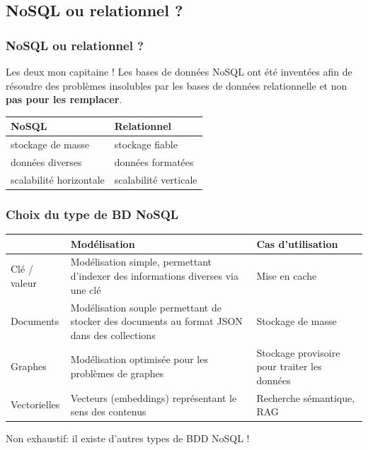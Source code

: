     \subsection{NoSQL ou relationnel ?}
        \begin{frame}
            \frametitle{NoSQL ou relationnel ?}

            \begin{alertblock}{Les deux mon capitaine !}
                Les bases de données NoSQL ont été inventées afin de résoudre des problèmes insolubles par les bases de données relationnelle et non \textbf{pas pour les remplacer}.
            \end{alertblock}

            \vspace{20px}

            \begin{tabular}{|l|l|}
                \hline
                \textbf{NoSQL} & \textbf{Relationnel} \\ \hline\hline
                stockage de masse & stockage fiable \\ \hline
                données diverses & données formatées \\ \hline
                scalabilité horizontale & scalabilité verticale \\ \hline
            \end{tabular}
        \end{frame}

        \begin{frame}
            \frametitle{Choix du type de BD NoSQL}

            \small
            \begin{tabular}{|p{}|p{}|p{}|}
                \hline
                & Modélisation & Cas d'utilisation \\\hline
                Clé / valeur
                & Modélisation simple, permettant d'indexer des informations diverses via une clé
                & Mise en cache  \\\hline
                Documents
                & Modélisation souple permettant de stocker des documents au format JSON dans des collections
                & Stockage de masse \\\hline
                Graphes
                & Modélisation optimisée pour les problèmes de graphes
                & Stockage provisoire pour traiter les données \\\hline
                Vectorielles
                & Vecteurs (embeddings) représentant le sens des contenus
                & Recherche sémantique, RAG \\\hline
            \end{tabular}

            \vspace{5px}

            Non exhaustif: il existe d'autres types de BDD NoSQL !
        \end{frame}

